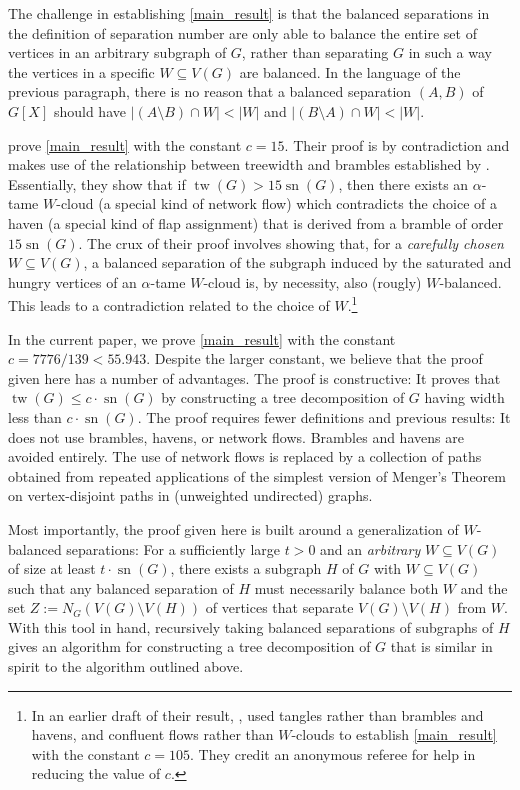 \documentclass{patmorin}
\DeclareMathOperator{\sep}{sn}
\DeclareMathOperator{\tw}{tw}
\begin{document}
The challenge in establishing \cref{main_result} is that the balanced separations in the definition of separation number are only able to balance the entire set of vertices in an arbitrary subgraph of $G$, rather than separating $G$ in such a way the vertices in a specific $W\subseteq V(G)$ are balanced.  In the language of the previous paragraph, there is no reason that a balanced separation $(A,B)$ of $G[X]$ should have $|(A\setminus B)\cap W|<|W|$ and $|(B\setminus A)\cap W|<|W|$.

\citet{dvorak.norin:treewidth} prove \cref{main_result} with the constant $c=15$. Their proof is by contradiction and makes use of the relationship between treewidth and brambles established by \citet{seymour.thomas:graph}.  Essentially, they show that if $\tw(G)>15\sep(G)$, then there exists an $\alpha$-tame $W$-cloud (a special kind of network flow) which contradicts the choice of a haven (a special kind of flap assignment) that is derived from a bramble of order $15\sep(G)$.  The crux of their proof \cite[Proof of Lemma~7]{dvorak.norin:treewidth} involves showing that, for a \emph{carefully chosen} $W\subseteq V(G)$, a balanced separation of the subgraph induced by the saturated and hungry vertices of an $\alpha$-tame $W$-cloud is, by necessity, also (rougly) $W$-balanced. This leads to a contradiction related to the choice of $W$.\footnote{In an earlier draft of their result, \citet{dvorak.norin:treewidth_v1}, used tangles rather than brambles and havens, and confluent flows \cite{chen.kleinberg.ea:almost} rather than $W$-clouds to establish \cref{main_result} with the constant $c=105$.  They credit an anonymous referee for help in reducing the value of $c$.}

In the current paper, we prove \cref{main_result} with the constant $c=7776/139< 55.943$.  Despite the larger constant, we believe that the proof given here has a number of advantages.  The proof is constructive: It proves that $\tw(G)\le c\cdot \sep(G)$ by constructing a tree decomposition of $G$ having width less than $c\cdot\sep(G)$.  The proof requires fewer definitions and previous results: It does not use brambles, havens, or network flows.  Brambles and havens are avoided entirely.  The use of network flows is replaced by a collection of paths obtained from repeated applications of the simplest version of Menger's Theorem on vertex-disjoint paths in (unweighted undirected) graphs.

Most importantly, the proof given here is built around a generalization of $W$-balanced separations:  For a sufficiently large $t>0$ and an \emph{arbitrary} $W\subseteq V(G)$ of size at least $t\cdot \sep(G)$, there exists a subgraph $H$ of $G$ with $W\subseteq V(G)$ such that any balanced separation of $H$ must necessarily balance both $W$ and the set $Z:=N_G(V(G)\setminus V(H))$ of vertices that separate $V(G)\setminus V(H)$ from $W$. With this tool in hand, recursively taking balanced separations of subgraphs of $H$ gives an algorithm for constructing a tree decomposition of $G$ that is similar in spirit to the algorithm outlined above.
\end{document}
